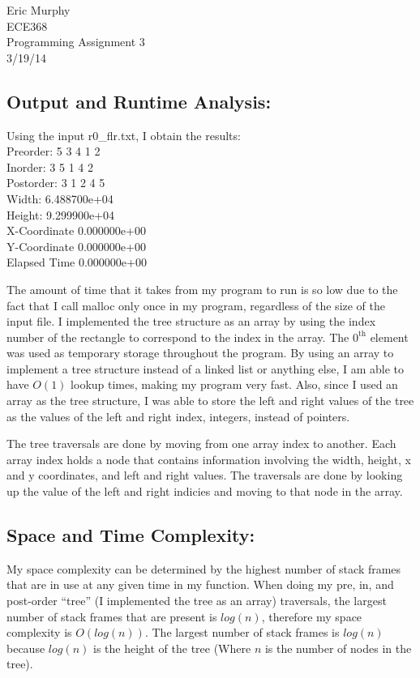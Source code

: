 \documentclass[12pt]{article}
\begin{document}
\begin{flushright}
  Eric Murphy \\
  ECE368 \\
  Programming Assignment 3 \\
  3/19/14
\end{flushright}

\subsection*{Output and Runtime Analysis:}
Using the input r0\_flr.txt, I obtain the results:\\

Preorder: 5 3 4 1 2\\
\indent Inorder: 3 5 1 4 2\\
\indent Postorder: 3 1 2 4 5\\
\indent Width: 6.488700e+04\\
\indent Height: 9.299900e+04\\
\indent X-Coordinate 0.000000e+00\\
\indent Y-Coordinate 0.000000e+00\\
\indent Elapsed Time 0.000000e+00

\noindent \newline The amount of time that it takes from my program to run is so low due to the fact that I call malloc only once in my program, regardless of the size of the input file.
I implemented the tree structure as an array by using the index number of the rectangle to correspond to the index in the array.
The $0^{\mbox{th}}$ element was used as temporary storage throughout the program.
By using an array to implement a tree structure instead of a linked list or anything else, I am able to have $O(1)$ lookup times, making my program very fast.
Also, since I used an array as the tree structure, I was able to store the left and right values of the tree as the values of the left and right index, integers, instead of pointers.

\noindent \newline The tree traversals are done by moving from one array index to another.  Each array index holds a node that contains information involving the width, height, x and y coordinates, and left and right values.  The traversals are done by looking up the value of the left and right indicies and moving to that node in the array.

\subsection*{Space and Time Complexity:}
My space complexity can be determined by the highest number of stack frames that are in use at any given time in my function.
When doing my pre, in, and post-order ``tree'' (I implemented the tree as an array) traversals, the largest number of stack frames that are present is $log(n)$, therefore my space complexity is $O(log(n))$.
The largest number of stack frames is $log(n)$ because $log(n)$ is the height of the tree (Where $n$ is the number of nodes in the tree).
\end{document}
